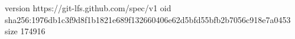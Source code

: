 version https://git-lfs.github.com/spec/v1
oid sha256:1976db1c3f9d8f1b1821e689f132660406e62d5bfd55bfb2b7056c918e7a0453
size 174916
